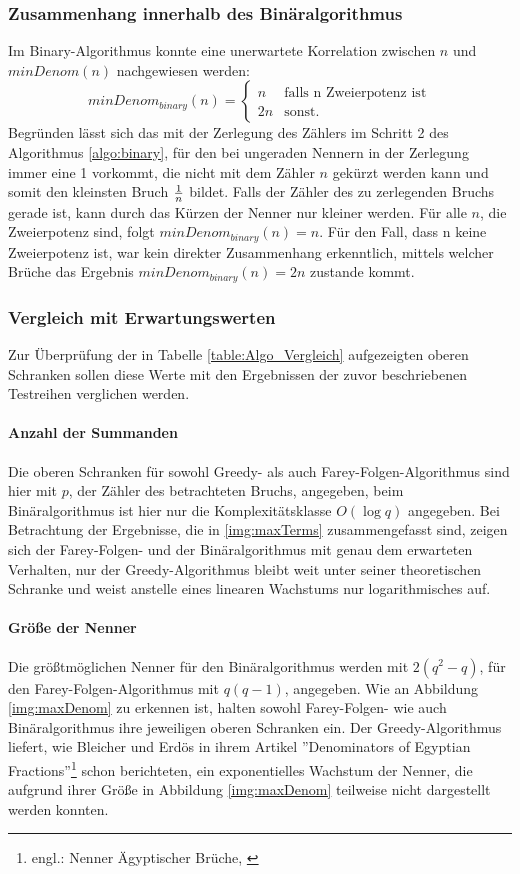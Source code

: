 \subsubsection{Zusammenhang innerhalb des Binäralgorithmus}
Im Binary-Algorithmus konnte eine unerwartete Korrelation zwischen $n$ und $minDenom(n)$ nachgewiesen werden:
\begin{equation*}
	minDenom_{binary}(n) = 
	\begin{cases}
		n & \text{falls n Zweierpotenz ist} \\
		2n & \text{sonst.}
	\end{cases}
\end{equation*}
Begründen lässt sich das mit der Zerlegung des Zählers im Schritt 2 des Algorithmus \ref{algo:binary}, für den bei ungeraden Nennern in der Zerlegung immer eine 1 vorkommt, die nicht mit dem Zähler $n$ gekürzt werden kann und somit den kleinsten Bruch $\frac{1}{n}$ bildet. Falls der Zähler des zu zerlegenden Bruchs gerade ist, kann durch das Kürzen der Nenner nur kleiner werden. Für alle $n$, die Zweierpotenz sind, folgt $minDenom_{binary}(n) = n$. Für den Fall, dass n keine Zweierpotenz ist, war kein direkter Zusammenhang erkenntlich, mittels welcher Brüche das Ergebnis $minDenom_{binary}(n) = 2n$ zustande kommt.

\subsubsection{Vergleich mit Erwartungswerten}
Zur Überprüfung der in Tabelle \ref{table:Algo_Vergleich} aufgezeigten oberen Schranken sollen diese Werte mit den Ergebnissen der zuvor beschriebenen Testreihen verglichen werden.

\paragraph{Anzahl der Summanden}Die oberen Schranken für sowohl Greedy- als auch Farey-Folgen-Al\-go\-rith\-mus sind hier mit $p$, der Zähler des betrachteten Bruchs, angegeben, beim Binäralgorithmus ist hier nur die Komplexitätsklasse $O(\log q)$ angegeben. Bei Betrachtung der Ergebnisse, die in \ref{img:maxTerms} zusammengefasst sind, zeigen sich der Farey-Folgen- und der Binäralgorithmus mit genau dem erwarteten Verhalten, nur der Greedy-Algorithmus bleibt weit unter seiner theoretischen Schranke und weist anstelle eines linearen Wachstums nur logarithmisches auf.
\paragraph{Größe der Nenner}Die größtmöglichen Nenner für den Binäralgorithmus werden mit $2(q^2-q)$, für den Farey-Folgen-Algorithmus mit $q(q-1)$, angegeben. Wie an Abbildung \ref{img:maxDenom} zu erkennen ist, halten sowohl Farey-Folgen- wie auch Binäralgorithmus ihre jeweiligen oberen Schranken ein.
Der Greedy-Algorithmus liefert, wie Bleicher und Erdös in ihrem Artikel ''Denominators of Egyptian Fractions''\footnote{engl.: Nenner Ägyptischer Brüche, \cite[S. 157]{BleicherErdoes1976}} schon berichteten, ein exponentielles Wachstum der Nenner, die aufgrund ihrer Größe in Abbildung \ref{img:maxDenom} teilweise nicht dargestellt werden konnten.

